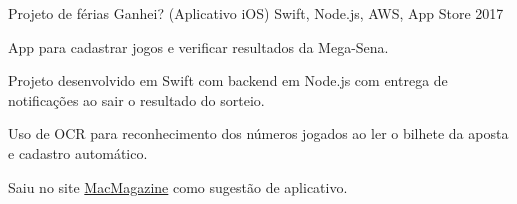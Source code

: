 \begin{cventries}
  \cventry
    {Projeto de férias} %
    {Ganhei? (Aplicativo iOS)} %
    {Swift, Node.js, AWS, App Store} %
    {2017} %
    {
      \begin{cvitems} %
        \item {App para cadastrar jogos e verificar resultados da Mega-Sena.}
        \item {Projeto desenvolvido em Swift com backend em Node.js com entrega de notificações ao sair o resultado do sorteio.}
        \item {Uso de OCR para reconhecimento dos números jogados ao ler o bilhete da aposta e cadastro automático.}
        \item {Saiu no site \href{https://macmagazine.com.br/post/2017/06/14/com-o-app-ganhei-voce-cadastra-seus-jogos-da-mega-sena-com-uma-foto-e-sabe-se-ficou-milionario-em-primeira-mao/}{MacMagazine} como sugestão de aplicativo.}
      \end{cvitems}
    }


\end{cventries}
